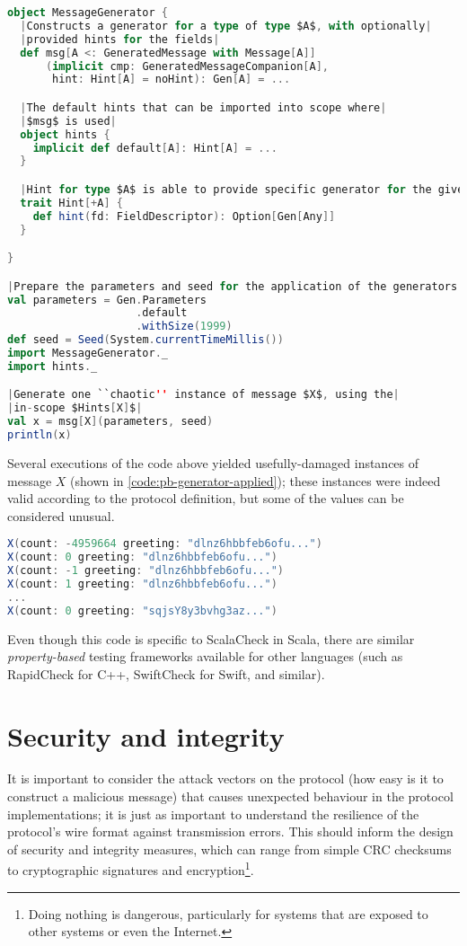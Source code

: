 \begin{lstlisting}[caption={Generator}, label={code:pb-generator}, language=Scala, escapechar=|]
object MessageGenerator {
  |Constructs a generator for a type of type $A$, with optionally|
  |provided hints for the fields|
  def msg[A <: GeneratedMessage with Message[A]]
      (implicit cmp: GeneratedMessageCompanion[A], 
       hint: Hint[A] = noHint): Gen[A] = ...

  |The default hints that can be imported into scope where|
  |$msg$ is used|
  object hints {
    implicit def default[A]: Hint[A] = ...
  }

  |Hint for type $A$ is able to provide specific generator for the given $fd$|
  trait Hint[+A] {
    def hint(fd: FieldDescriptor): Option[Gen[Any]]
  }

}

|Prepare the parameters and seed for the application of the generators|
val parameters = Gen.Parameters
                    .default
                    .withSize(1999)
def seed = Seed(System.currentTimeMillis())
import MessageGenerator._
import hints._

|Generate one ``chaotic'' instance of message $X$, using the|
|in-scope $Hints[X]$|
val x = msg[X](parameters, seed)
println(x)
\end{lstlisting}

Several executions of the code above yielded usefully-damaged instances of message $X$ (shown in \autoref{code:pb-generator-applied}); these instances were indeed valid according to the protocol definition, but some of the values can be considered unusual. 

\begin{lstlisting}[caption={Generator examples}, label={code:pb-generator-applied}, language=Scala, escapechar=|]
X(count: -4959664 greeting: "dlnz6hbbfeb6ofu...")
X(count: 0 greeting: "dlnz6hbbfeb6ofu...")
X(count: -1 greeting: "dlnz6hbbfeb6ofu...")
X(count: 1 greeting: "dlnz6hbbfeb6ofu...")
...
X(count: 0 greeting: "sqjsY8y3bvhg3az...")
\end{lstlisting}

Even though this code is specific to ScalaCheck\cite{scalacheck} in Scala, there are similar \emph{property-based} testing frameworks available for other languages (such as RapidCheck\cite{rapidcheck} for C++, SwiftCheck\cite{swiftcheck} for Swift, and similar). 

\section{Security and integrity}
It is important to consider the attack vectors on the protocol (how easy is it to construct a malicious message) that causes unexpected behaviour in the protocol implementations; it is just as important to understand the resilience of the protocol's wire format against transmission errors. This should inform the design of security and integrity measures, which can range from simple CRC checksums to cryptographic signatures and encryption\footnote{Doing nothing is dangerous, particularly for systems that are exposed to other systems or even the Internet.}. 

